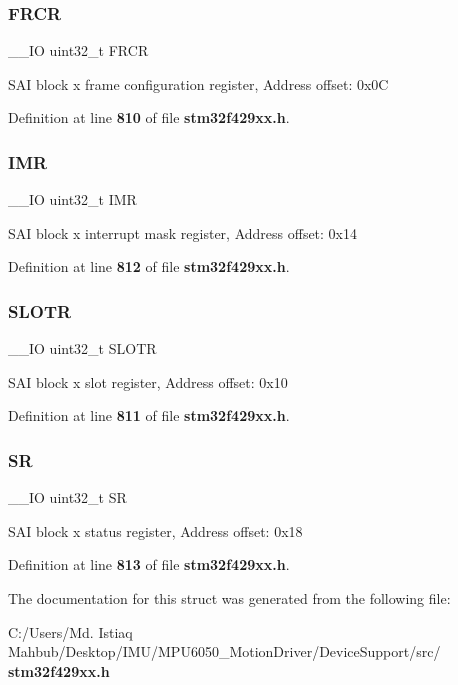 \subsubsection{F\+R\+CR}
{\footnotesize\ttfamily \+\_\+\+\_\+\+IO uint32\+\_\+t F\+R\+CR}

S\+AI block x frame configuration register, Address offset\+: 0x0C 

Definition at line \textbf{ 810} of file \textbf{ stm32f429xx.\+h}.

\mbox{\label{structSAI__Block__TypeDef_ae845b86e973b4bf8a33c447c261633f6}} 
\subsubsection{I\+MR}
{\footnotesize\ttfamily \+\_\+\+\_\+\+IO uint32\+\_\+t I\+MR}

S\+AI block x interrupt mask register, Address offset\+: 0x14 

Definition at line \textbf{ 812} of file \textbf{ stm32f429xx.\+h}.

\mbox{\label{structSAI__Block__TypeDef_ad30f20f612dacf85a5bb7f9f97cf0772}} 
\subsubsection{S\+L\+O\+TR}
{\footnotesize\ttfamily \+\_\+\+\_\+\+IO uint32\+\_\+t S\+L\+O\+TR}

S\+AI block x slot register, Address offset\+: 0x10 

Definition at line \textbf{ 811} of file \textbf{ stm32f429xx.\+h}.

\mbox{\label{structSAI__Block__TypeDef_af6aca2bbd40c0fb6df7c3aebe224a360}} 
\subsubsection{SR}
{\footnotesize\ttfamily \+\_\+\+\_\+\+IO uint32\+\_\+t SR}

S\+AI block x status register, Address offset\+: 0x18 

Definition at line \textbf{ 813} of file \textbf{ stm32f429xx.\+h}.



The documentation for this struct was generated from the following file\+:\begin{DoxyCompactItemize}
\item 
C\+:/\+Users/\+Md. Istiaq Mahbub/\+Desktop/\+I\+M\+U/\+M\+P\+U6050\+\_\+\+Motion\+Driver/\+Device\+Support/src/\textbf{ stm32f429xx.\+h}\end{DoxyCompactItemize}
